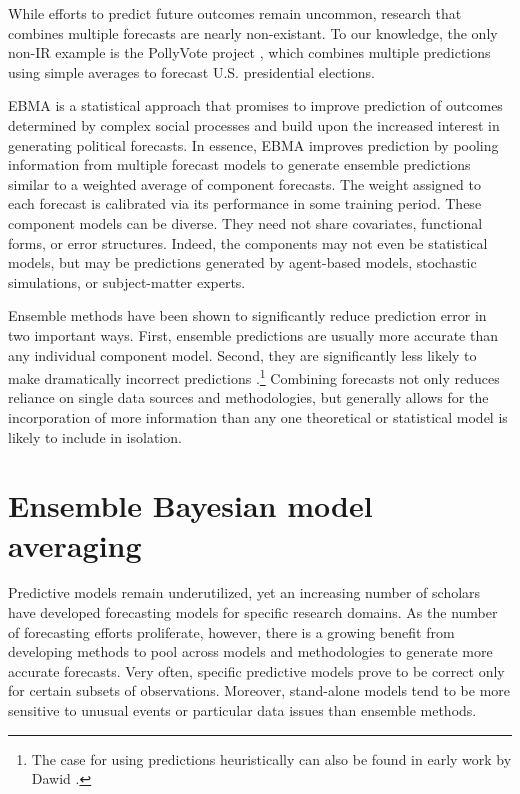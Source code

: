 \documentclass[pdftex,12pt,fullpage,oneside]{amsart}
\begin{document}
While efforts to predict future outcomes remain uncommon, research
that combines multiple forecasts are nearly non-existant.  To our
knowledge, the only non-IR example is the PollyVote project
\citep[c.f.][]{Graefe:2010}, which combines multiple predictions using
simple averages to forecast U.S. presidential elections.

EBMA is a statistical approach that promises to improve prediction of
outcomes determined by complex social processes and build upon the
increased interest in generating political forecasts. In essence, EBMA
improves prediction by pooling information from multiple forecast
models to generate ensemble predictions similar to a weighted average
of component forecasts. The weight assigned to each forecast is
calibrated via its performance in some training period.  These
component models can be diverse.  They need not share covariates,
functional forms, or error structures. Indeed, the components may not
even be statistical models, but may be predictions generated by
agent-based models, stochastic simulations, or subject-matter experts.


Ensemble methods have been shown to significantly reduce prediction
error in two important ways.  First, ensemble predictions are usually
more accurate than any individual component model. Second, they are
significantly less likely to make dramatically incorrect predictions
\citep{Bates:1969, Armstrong:2001, Raftery:2005}.\footnote{The case
  for using predictions heuristically can also be found in early work
  by Dawid \citep{dawid:1982,dawid:1984}.}  Combining forecasts not
only reduces reliance on single data sources and methodologies, but
generally allows for the incorporation of more information than any
one theoretical or statistical model is likely to include in
isolation.


\setcounter{section}{1}

\section{Ensemble Bayesian model averaging} 

Predictive models remain underutilized, yet an increasing number of
scholars have developed forecasting models for specific research
domains.  As the number of forecasting efforts proliferate, however,
there is a growing benefit from developing methods to pool across
models and methodologies to generate more accurate forecasts.  Very
often, specific predictive models prove to be correct only for certain
subsets of observations.  Moreover, stand-alone models tend to be more
sensitive to unusual events or particular data issues than ensemble
methods.
\end{document}
